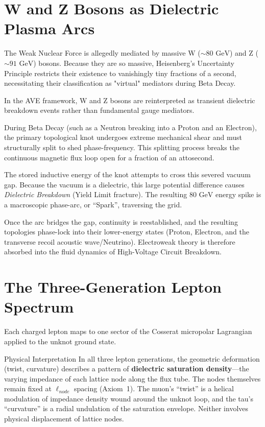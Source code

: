 \section{W and Z Bosons as Dielectric Plasma Arcs}
The Weak Nuclear Force is allegedly mediated by massive W ($\sim 80 \text{ GeV}$) and Z ($\sim 91 \text{ GeV}$) bosons. Because they are so massive, Heisenberg's Uncertainty Principle restricts their existence to vanishingly tiny fractions of a second, necessitating their classification as "virtual" mediators during Beta Decay.

In the AVE framework, W and Z bosons are reinterpreted as transient dielectric breakdown events rather than fundamental gauge mediators.

During Beta Decay (such as a Neutron breaking into a Proton and an Electron), the primary topological knot undergoes extreme mechanical shear and must structurally split to shed phase-frequency. This splitting process breaks the continuous magnetic flux loop open for a fraction of an attosecond. 

The stored inductive energy of the knot attempts to cross this severed vacuum gap. Because the vacuum is a dielectric, this large potential difference causes \textit{Dielectric Breakdown} (Yield Limit fracture). The resulting $80 \text{ GeV}$ energy spike is a macroscopic phase-arc, or ``Spark'', traversing the grid. 

Once the arc bridges the gap, continuity is reestablished, and the resulting topologies phase-lock into their lower-energy states (Proton, Electron, and the transverse recoil acoustic wave/Neutrino). Electroweak theory is therefore absorbed into the fluid dynamics of High-Voltage Circuit Breakdown.

\section{The Three-Generation Lepton Spectrum}

Each charged lepton maps to one sector of the Cosserat micropolar Lagrangian applied to the unknot ground state.

\begin{resultbox}{Physical Interpretation}
In all three lepton generations, the geometric deformation (twist, curvature) describes a pattern of \textbf{dielectric saturation density}---the varying impedance of each lattice node along the flux tube. The nodes themselves remain fixed at $\ell_{node}$ spacing (Axiom~1). The muon's ``twist'' is a helical modulation of impedance density wound around the unknot loop, and the tau's ``curvature'' is a radial undulation of the saturation envelope. Neither involves physical displacement of lattice nodes.
\end{resultbox}

